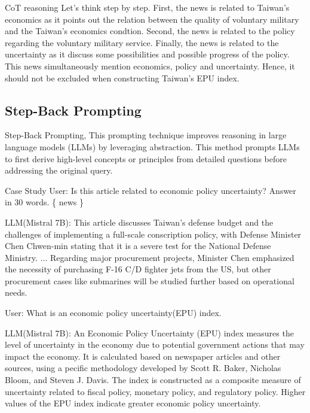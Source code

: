 \documentclass[11.5pt]{beamer}
\begin{document}
\begin{frame}{CoT reasoning}
Let's think step by step. First, the news is related to Taiwan's economics as
it points out the relation between the quality of voluntary military and the
Taiwan's economics condtion. Second, the news is related to the policy
regarding the voluntary military service. Finally, the news is related to the
uncertainty as it discuss some possibilities and possible progress of the policy.
This news simultaneously mention economics, policy and uncertainty. Hence,
it should not be excluded when constructing Taiwan's EPU index.
\end{frame}


\subsection{Step-Back Prompting}
\begin{frame}{Step-Back Prompting, \cite{Zheng2023}}
This prompting technique improves reasoning in large language models (LLMs)
by leveraging abstraction. This method prompts LLMs to first derive high-level
concepts or principles from detailed questions before addressing the original
query.
\end{frame}

\begin{frame}{Case Study}
User: \newline
Is this article related to economic policy uncertainty? Answer in 30 words. \newline
\{ news \}

LLM(Mistral 7B): \newline
This article discusses Taiwan's defense budget and the challenges of
implementing a full-scale conscription policy, with Defense Minister Chen
Chwen-min stating that it is a severe test for the National Defense Ministry. \newline
... \newline
Regarding major procurement projects, Minister Chen emphasized the necessity
of purchasing F-16 C/D fighter jets from the US, but other procurement cases
like submarines will be studied further based on operational needs.
\end{frame}

\begin{frame}
User: \newline
What is an economic policy uncertainty(EPU) index.

LLM(Mistral 7B): \newline
An Economic Policy Uncertainty (EPU) index measures the level of uncertainty
in the economy due to potential government actions that may impact the economy.
It is calculated based on newspaper articles and other sources, using a
pecific methodology developed by Scott R. Baker, Nicholas Bloom, and
Steven J. Davis. The index is constructed as a composite measure of
uncertainty related to fiscal policy, monetary policy, and regulatory policy.
Higher values of the EPU index indicate greater economic policy uncertainty.
\end{frame}
\end{document}
